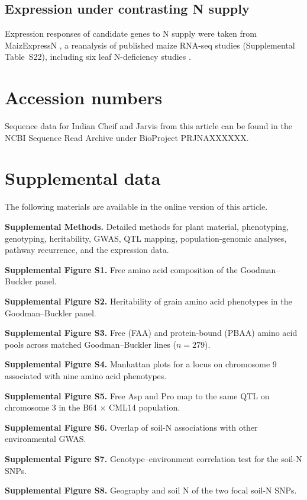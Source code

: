 \documentclass[namedate,unnumsec,webpdf,contemporary,large]{oup-authoring-template}
\begin{document}
\subsection{Expression under contrasting N supply}
Expression responses of candidate genes to N supply were taken from MaizExpressN \citep{MaizExpressN}, a reanalysis of published maize RNA-seq studies (Supplemental Table~S22), including six leaf N-deficiency studies \citep{Mu2017LN, Guo2022LN, Ma2021LN, TorresRodriguez2021LN, AlonsoNieves2022LN, Wang2025NRT25}.

\section{Accession numbers}
Sequence data for Indian Cheif and Jarvis from this article can be found in the NCBI Sequence Read Archive under BioProject PRJNAXXXXXX.

\section{Supplemental data}
The following materials are available in the online version of this article.

\textbf{Supplemental Methods.} Detailed methods for plant material, phenotyping, genotyping, heritability, GWAS, QTL mapping, population-genomic analyses, pathway recurrence, and the expression data.

\textbf{Supplemental Figure S1.} Free amino acid composition of the Goodman--Buckler panel.

\textbf{Supplemental Figure S2.} Heritability of grain amino acid phenotypes in the Goodman--Buckler panel.

\textbf{Supplemental Figure S3.} Free (FAA) and protein-bound (PBAA) amino acid pools across matched Goodman--Buckler lines ($n = 279$).

\textbf{Supplemental Figure S4.} Manhattan plots for a locus on chromosome 9 associated with nine amino acid phenotypes.

\textbf{Supplemental Figure S5.} Free Asp and Pro map to the same QTL on chromosome 3 in the B64 $\times$ CML14 population.

\textbf{Supplemental Figure S6.} Overlap of soil-N associations with other environmental GWAS.

\textbf{Supplemental Figure S7.} Genotype--environment correlation test for the soil-N SNPs.

\textbf{Supplemental Figure S8.} Geography and soil N of the two focal soil-N SNPs.
\end{document}

